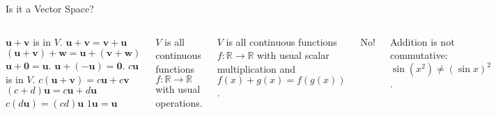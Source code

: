 \documentclass[xcolor=dvipsnames,aspectratio=169,t]{beamer}
\begin{document}
\begin{frame}{Is it a Vector Space?}
\begin{columns}[T]

\column{0.33\tw}

\bb
\ii $\mathbf{u} + \mathbf{v}$ is in $V$.
\ii $\mathbf{u} + \mathbf{v} = \mathbf{v} + \mathbf{u}$
\ii $(\mathbf{u} + \mathbf{v}) + \mathbf{w} = \mathbf{u} + (\mathbf{v} + \mathbf{w})$
\ii $\mathbf{u} + \mathbf{0} = \mathbf{u}$.
\ii $\mathbf{u} + (- \mathbf{u}) = \mathbf{0}$.
\ii $c \mathbf{u}$ is in $V$.
\ii $c( \mathbf{u} + \mathbf{v} ) = c \mathbf{u} + c \mathbf{v}$
\ii $(c+d)  \mathbf{u} = c \mathbf{u} + d \mathbf{u}$
\ii $c (d \mathbf{u}) = (cd) \mathbf{u}$
\ii $1 \mathbf{u} = \mathbf{u}$
\ee

\column{0.67\tw}

  $V$ is all continuous functions $f\colon\mathbb{R} \to \mathbb{R}$ with usual operations.
  \medskip
 
  \pause {}
 
  \vspace*{2em}
 
  \pause
  $V$ is all continuous functions $f\colon\mathbb{R} \to \mathbb{R}$ with usual scalar multiplication and $f(x) + g(x) = f(g(x))$.
  \medskip
  
  \pause
  \alert{No!}
  
  Addition is not commutative: $\sin(x^2)\ne (\sin x)^2$.
\end{columns}

\end{frame}


% 
\end{document}
